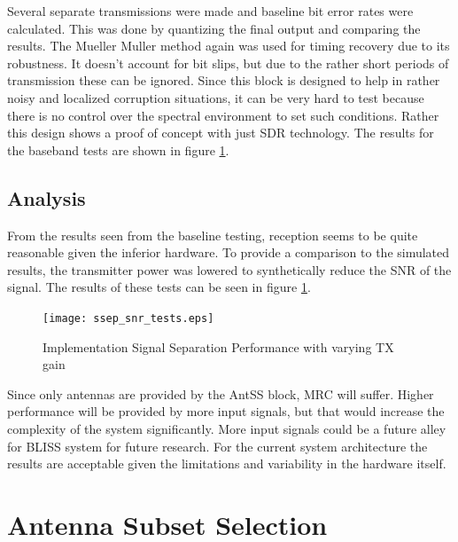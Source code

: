 Several separate transmissions were made and baseline bit error rates were calculated.  This was done by quantizing the final output and comparing the results.  The Mueller Muller method again was used for timing recovery due to its robustness.  It doesn't account for bit slips, but due to the rather short periods of transmission these can be ignored.  Since this block is designed to help in rather noisy and localized corruption situations, it can be very hard to test because there is no control over the spectral environment to set such conditions.  Rather this design shows a proof of concept with just SDR technology.  The results for the baseband tests are shown in figure \ref{ssep_snr_tests}.\\


\subsection{Analysis}

From the results seen from the baseline testing, reception seems to be quite reasonable given the inferior hardware. To provide a comparison to the simulated results, the transmitter power was lowered to synthetically reduce the SNR of the signal.  The results of these tests can be seen in figure \ref{ssep_snr_tests}.   

\begin{figure}\label{ssep_snr_tests}
\centering
\texttt{[image: ssep\_snr\_tests.eps]}
\caption{Implementation Signal Separation Performance with varying TX gain}
\end{figure}

Since only antennas are provided by the AntSS block, MRC will suffer.  Higher performance will be provided by more input signals, but that would increase the complexity of the system significantly.  More input signals could be a future alley for BLISS system for future research.  For the current system architecture the results are acceptable given the limitations and variability in the hardware itself.\\

\section{Antenna Subset Selection}

